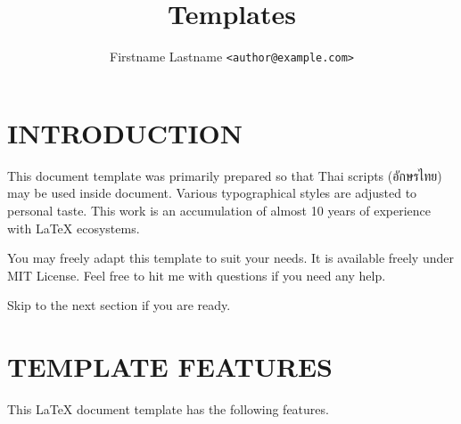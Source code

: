 \documentclass[9pt,a4paper]{extarticle}
\title{\XeLaTeX{} Templates}
\author{Firstname Lastname \texttt{<author@example.com>}}
\date{}
\begin{document}
\maketitle


\section{INTRODUCTION}

This document template was primarily prepared so that
Thai scripts (อักษรไทย) may be used inside \XeLaTeX{} document.
Various typographical styles are adjusted to personal taste.
This work is an accumulation of almost 10 years of experience with \LaTeX{} ecosystems.

You may freely adapt this template to suit your needs.
It is available freely under MIT License.
Feel free to hit me with questions if you need any help.

Skip to the next section if you are ready.

\lipsum[1]


\section{TEMPLATE FEATURES}

This \LaTeX{} document template has the following features.
\end{document}
